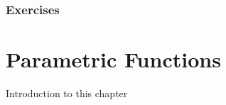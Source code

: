 \documentclass[10pt,]{book}
\theoremstyle{ptxdefinitionnotitle}
\theoremstyle{ptxdefinitiontitle}
\theoremstyle{ptxdefinitionnotitle}
\theoremstyle{ptxdefinitiontitle}
\theoremstyle{ptxdefinitionnotitle}
\theoremstyle{ptxdefinitiontitle}
\numberwithin{equation}{section}
\begin{document}
\subsection*{Exercises}\hypertarget{exercises-15}{}
\begin{divisionexercise}{1}\hypertarget{exercise-101}{}
\hypertarget{p-385}{}%
%
\end{divisionexercise}%
\begin{divisionexercise}{2}\hypertarget{exercise-102}{}
\hypertarget{p-386}{}%
%
\end{divisionexercise}%
\begin{divisionexercise}{3}\hypertarget{exercise-103}{}
\hypertarget{p-387}{}%
%
\end{divisionexercise}%
\begin{divisionexercise}{4}\hypertarget{exercise-104}{}
\hypertarget{p-388}{}%
%
\end{divisionexercise}%
\begin{divisionexercise}{5}\hypertarget{exercise-105}{}
\hypertarget{p-389}{}%
%
\end{divisionexercise}%
\begin{divisionexercise}{6}\hypertarget{exercise-106}{}
\hypertarget{p-390}{}%
%
\end{divisionexercise}%
\begin{divisionexercise}{7}\hypertarget{exercise-107}{}
\hypertarget{p-391}{}%
%
\end{divisionexercise}%
\begin{divisionexercise}{8}\hypertarget{exercise-108}{}
\hypertarget{p-392}{}%
%
\end{divisionexercise}%
\begin{divisionexercise}{9}\hypertarget{exercise-109}{}
\hypertarget{p-393}{}%
%
\end{divisionexercise}%
\begin{divisionexercise}{10}\hypertarget{exercise-110}{}
\hypertarget{p-394}{}%
%
\end{divisionexercise}%
\typeout{************************************************}
\typeout{************************************************}
\chapter[{Parametric Functions}]{Parametric Functions}\label{chapter06}
\hypertarget{p-395}{}%
Introduction to this chapter%
\typeout{************************************************}
\typeout{************************************************}
\end{document}
